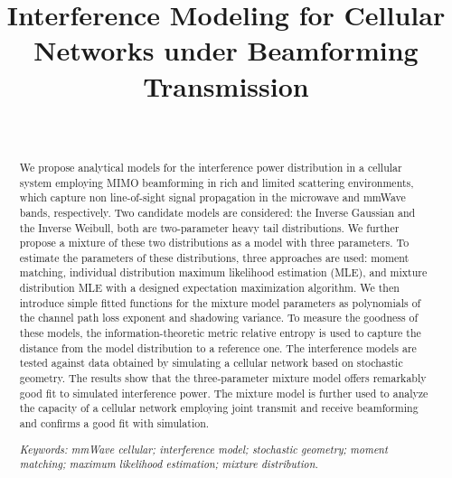 \documentclass[12pt, draftclsnofoot, onecolumn]{IEEEtran}
\theoremstyle{plain}
\begin{document}
%

\title{Interference Modeling for Cellular Networks under Beamforming Transmission}
\author{{\normalsize {}\\
}}







\maketitle

\vspace{-12mm}
\begin{abstract}
\vspace{-.15in}
We propose analytical models for the interference power distribution in a cellular system employing MIMO beamforming in {rich and limited scattering environments, which capture {non line-of-sight } signal propagation in the microwave and mmWave bands, respectively.} Two candidate models are considered: the Inverse Gaussian and the Inverse Weibull, both are two-parameter heavy tail distributions. We further propose a mixture of these two distributions as a model with three parameters. To estimate the parameters of these distributions, three approaches are used: moment matching, individual distribution maximum likelihood estimation (MLE), and mixture distribution MLE with a designed expectation maximization algorithm. We then introduce simple fitted functions for the mixture model parameters as polynomials of {the channel path loss exponent and shadowing variance}. To measure the goodness of these models, the information-theoretic metric relative entropy is used to capture the distance from the model distribution to a reference one. {The interference models are tested against data obtained by simulating a cellular network based on stochastic geometry. The results show that the three-parameter mixture model offers remarkably good fit to simulated interference power.} The mixture model is further used to analyze the capacity of a cellular network employing joint transmit and receive beamforming and confirms a good fit with simulation. 


\textit{Keywords: mmWave cellular; interference model; stochastic geometry; moment matching; maximum likelihood estimation; mixture distribution.}
\end{abstract}
\end{document}

